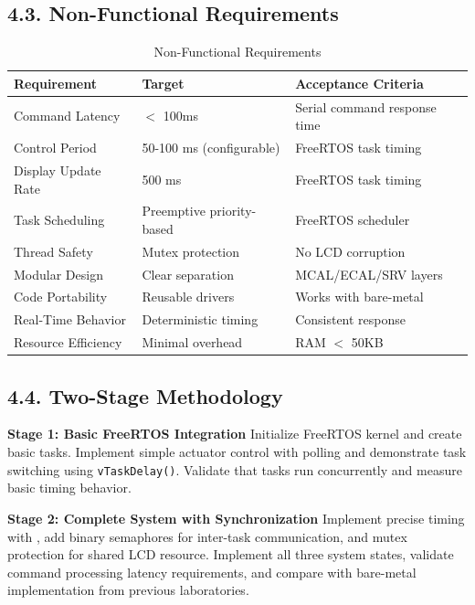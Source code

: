 \documentclass[12pt]{article}
\begin{document}
\subsection*{4.3. Non-Functional Requirements}

\begin{table}[H]
	\centering
	\caption{Non-Functional Requirements}
	\label{tab:non-functional-requirements}
	\begin{tabular}{|l|l|l|}
		\hline
		\textbf{Requirement} & \textbf{Target} & \textbf{Acceptance Criteria} \\
		\hline
		Command Latency & $<$ 100ms & Serial command response time \\
		\hline
		Control Period & 50-100 ms (configurable) & FreeRTOS task timing \\
		\hline
		Display Update Rate & 500 ms & FreeRTOS task timing \\
		\hline
		Task Scheduling & Preemptive priority-based & FreeRTOS scheduler \\
		\hline
		Thread Safety & Mutex protection & No LCD corruption \\
		\hline
		Modular Design & Clear separation & MCAL/ECAL/SRV layers \\
		\hline
		Code Portability & Reusable drivers & Works with bare-metal \\
		\hline
		Real-Time Behavior & Deterministic timing & Consistent response \\
		\hline
		Resource Efficiency & Minimal overhead & RAM $<$ 50KB \\
		\hline
	\end{tabular}
\end{table}

\subsection*{4.4. Two-Stage Methodology}

\textbf{Stage 1: Basic FreeRTOS Integration}
\newline
Initialize FreeRTOS kernel and create basic tasks. Implement simple actuator control with polling and demonstrate task switching using \texttt{vTaskDelay()}. Validate that tasks run concurrently and measure basic timing behavior.

\textbf{Stage 2: Complete System with Synchronization}
\newline
Implement precise timing with , add binary semaphores for inter-task communication, and mutex protection for shared LCD resource. Implement all three system states, validate command processing latency requirements, and compare with bare-metal implementation from previous laboratories.
\end{document}

